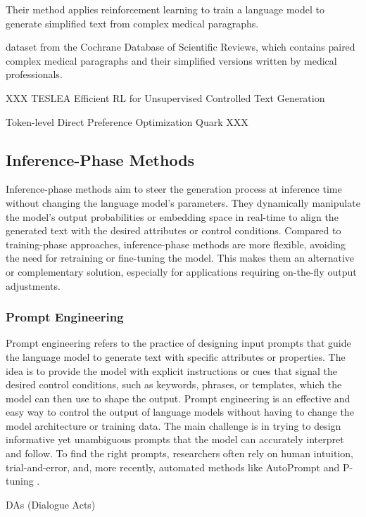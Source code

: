 Their method applies reinforcement learning to train a language model to generate simplified text from complex medical paragraphs.

dataset from the Cochrane Database of Scientific Reviews, which contains paired complex medical paragraphs and their simplified versions written by medical professionals.


XXX
TESLEA
Efficient RL for Unsupervised Controlled Text Generation

Token-level Direct Preference Optimization
Quark
XXX

\subsection{Inference-Phase Methods}
Inference-phase methods aim to steer the generation process at inference time without changing the language model's parameters.
They dynamically manipulate the model's output probabilities or embedding space in real-time to align the generated text with the desired attributes or control conditions.
Compared to training-phase approaches, inference-phase methods are more flexible, avoiding the need for retraining or fine-tuning the model.
This makes them an alternative or complementary solution, especially for applications requiring on-the-fly output adjustments.

\subsubsection{Prompt Engineering}
Prompt engineering refers to the practice of designing input prompts that guide the language model to generate text with specific attributes or properties. 
The idea is to provide the model with explicit instructions or cues that signal the desired control conditions, such as keywords, phrases, or templates, which the model can then use to shape the output.
Prompt engineering is an effective and easy way to control the output of language models without having to change the model architecture or training data.
The main challenge is in trying to design informative yet unambiguous prompts that the model can accurately interpret and follow.
To find the right prompts, researchers often rely on human intuition, trial-and-error, and, more recently, automated methods like AutoPrompt \cite{shin-etal-2020-autoprompt} and P-tuning \cite{liu-etal-2022-p}.

DAs (Dialogue Acts)

